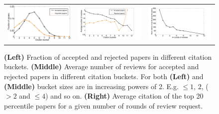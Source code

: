  \begin{figure}[htpb]
 \centering
 \begin{tabular}{ccc}
 \includegraphics[scale=0.135]{./texfiles/Chapter_4/jcdl/figures/citation_bucket_frac_paper} & \includegraphics[scale=0.135]{./texfiles/Chapter_4/jcdl/figures/citation_bucket_reviews_all-eps-converted-to.pdf} & \includegraphics[scale=0.135]{./texfiles/Chapter_4/jcdl/figures/cit_rnd_rev-eps-converted-to.pdf}
 \end{tabular}
  \caption{{\bf (Left)} Fraction of accepted and rejected papers in different citation buckets. {\bf (Middle)} Average number of reviews for accepted and rejected papers in different citation buckets. For both {\bf (Left)} and {\bf(Middle) } bucket sizes are in increasing powers of 2. E.g. $\leq 1$, $2$, ($>2$ and $\leq 4$) and so on. {\bf (Right)} Average citation of the top 20 percentile  papers for a given number of rounds of review request.}
   \label{fig4}
 \end{figure}


